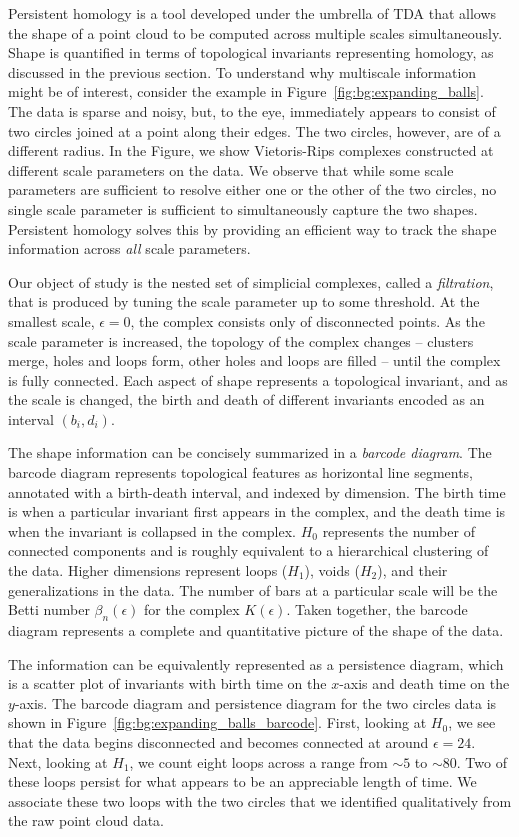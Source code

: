 Persistent homology is a tool developed under the umbrella of TDA that allows the shape of a point cloud to be computed across multiple scales simultaneously.
Shape is quantified in terms of topological invariants representing homology, as discussed in the previous section.
To understand why multiscale information might be of interest, consider the example in Figure~\ref{fig:bg:expanding_balls}.
The data is sparse and noisy, but, to the eye, immediately appears to consist of two circles joined at a point along their edges.
The two circles, however, are of a different radius.
In the Figure, we show Vietoris-Rips complexes constructed at different scale parameters on the data.
We observe that while some scale parameters are sufficient to resolve either one or the other of the two circles, no single scale parameter is sufficient to simultaneously capture the two shapes.
Persistent homology solves this by providing an efficient way to track the shape information across \emph{all} scale parameters.

Our object of study is the nested set of simplicial complexes, called a \emph{filtration}, that is produced by tuning the scale parameter up to some threshold.
At the smallest scale, $\epsilon=0$, the complex consists only of disconnected points.
As the scale parameter is increased, the topology of the complex changes -- clusters merge, holes and loops form, other holes and loops are filled -- until the complex is fully connected.
Each aspect of shape represents a topological invariant, and as the scale is changed, the birth and death of different invariants encoded as an interval $(b_i, d_i)$.

The shape information can be concisely summarized in a \emph{barcode diagram}.
The barcode diagram represents topological features as horizontal line segments, annotated with a birth-death interval, and indexed by dimension.
The birth time is when a particular invariant first appears in the complex, and the death time is when the invariant is collapsed in the complex.
$H_0$ represents the number of connected components and is roughly equivalent to a hierarchical clustering of the data.
Higher dimensions represent loops ($H_1$), voids ($H_2$), and their generalizations in the data.
The number of bars at a particular scale will be the Betti number $\beta_n(\epsilon)$ for the complex $K(\epsilon)$.
Taken together, the barcode diagram represents a complete and quantitative picture of the shape of the data.

The information can be equivalently represented as a persistence diagram, which is a scatter plot of invariants with birth time on the $x$-axis and death time on the $y$-axis.
The barcode diagram and persistence diagram for the two circles data is shown in Figure~\ref{fig:bg:expanding_balls_barcode}.
First, looking at $H_0$, we see that the data begins disconnected and becomes connected at around $\epsilon=24$.
Next, looking at $H_1$, we count eight loops across a range from $\sim5$ to $\sim80$.
Two of these loops persist for what appears to be an appreciable length of time.
We associate these two loops with the two circles that we identified qualitatively from the raw point cloud data.

